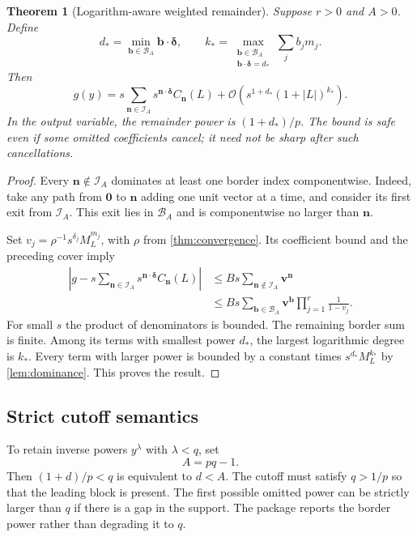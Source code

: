 \documentclass[11pt,a4paper]{article}
\numberwithin{equation}{section}
\newtheorem{theorem}{Theorem}[section]
\theoremstyle{definition}
\newcommand{\OO}{\mathcal O}
\newcommand{\nn}{\boldsymbol n}
\newcommand{\del}{\boldsymbol\delta}
\newcommand{\IA}{\mathcal I_A}
\newcommand{\BA}{\mathcal B_A}
\begin{document}
\begin{theorem}[Logarithm-aware weighted remainder]\label{thm:border}
Suppose $r>0$ and $A>0$. Define
\begin{equation}\label{eq:border-data}
 d_* =\min_{\boldsymbol b\in\BA}\boldsymbol b\cdot\del,
 \qquad
 k_* =\max_{\substack{\boldsymbol b\in\BA\\
               \boldsymbol b\cdot\del=d_*}}
                  \sum_j b_jm_j.
\end{equation}
Then
\begin{equation}\label{eq:border-remainder}
 g(y)=s\sum_{\nn\in\IA}s^{\nn\cdot\del}C_{\nn}(L)
       +\OO\!\left(s^{1+d_*}(1+|L|)^{k_*}\right).
\end{equation}
In the output variable, the remainder power is $(1+d_*)/p$. The bound is
safe even if some omitted coefficients cancel; it need not be sharp after
such cancellations.
\end{theorem}
\begin{proof}
Every $\nn\notin\IA$ dominates at least one border index componentwise.
Indeed, take any path from $\boldsymbol0$ to $\nn$ adding one unit vector
at a time, and consider its first exit from $\IA$. This exit lies in
$\BA$ and is componentwise no larger than $\nn$.

Set $v_j=\rho^{-1}s^{\delta_j}M_L^{m_j}$, with $\rho$ from
\cref{thm:convergence}. Its coefficient bound and the preceding cover imply
\begin{align*}
 \left|g-s\sum_{\nn\in\IA}s^{\nn\cdot\del}C_{\nn}(L)\right|
 &\le Bs\sum_{\nn\notin\IA}\boldsymbol v^{\nn}\\
 &\le Bs\sum_{\boldsymbol b\in\BA}\boldsymbol v^{\boldsymbol b}
           \prod_{j=1}^r\frac1{1-v_j}.
\end{align*}
For small $s$ the product of denominators is bounded. The remaining border
sum is finite. Among its terms with smallest power $d_*$, the largest
logarithmic degree is $k_*$. Every term with larger power is bounded by a
constant times $s^{d_*}M_L^{k_*}$ by \cref{lem:dominance}. This proves the
result.
\end{proof}

\subsection{Strict cutoff semantics}
To retain inverse powers $y^\lambda$ with $\lambda<q$, set
\begin{equation}\label{eq:cutoff-map}
 A=pq-1.
\end{equation}
Then $(1+d)/p<q$ is equivalent to $d<A$. The cutoff must satisfy
$q>1/p$ so that the leading block is present. The first possible omitted
power can be strictly larger than $q$ if there is a gap in the support.
The package reports the border power rather than degrading it to $q$.
\end{document}

